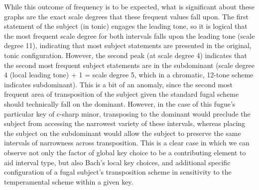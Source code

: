     \begin{center}
    \end{center}
    
    While this outcome of frequency is to be expected, what is significant
about these graphs are the exact scale degrees that these frequent
values fall upon. The first statement of the subject (in tonic) engages
the leading tone, so it is logical that the most frequent scale degree
for both intervals falls upon the leading tone (scale degree 11),
indicating that most subject statements are presented in the original,
tonic configuration. However, the second peak (at scale degree 4)
indicates that the second most frequent subject statements are in the
subdominant (scale degree 4 (local leading tone) + 1 = scale degree 5,
which in a chromatic, 12-tone scheme indicates subdominant). This is a
bit of an anomaly, since the second most frequent area of transposition
of the subject given the standard fugal scheme should technically fall
on the dominant. However, in the case of this fugue's particular key of
c-sharp minor, transposing to the dominant would preclude the subject
from accessing the narrowest variety of these intervals, whereas placing
the subject on the subdominant would allow the subject to preserve the
same intervals of narrowness across transposition. This is a clear case
in which we can observe not only the factor of global key choice to be a
contributing element to aid interval type, but also Bach's local key
choices, and additional specific configuration of a fugal subject's
transposition scheme in sensitivity to the temperamental scheme within a
given key.

